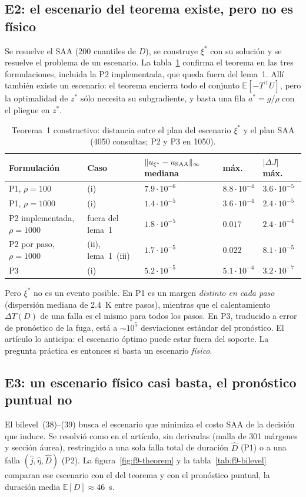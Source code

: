 \subsection{E2: el escenario del teorema existe, pero no es físico}
Se resuelve el SAA (200 cuantiles de $D$), se construye $\xi^*$ con su solución y se resuelve el
problema de un escenario. La tabla~\ref{tab:f9-teorema} confirma el teorema en las tres
formulaciones, incluida la P2 implementada, que queda fuera del lema~1. Allí también existe un
escenario: el teorema encierra todo el conjunto $\mathbb E[-T^\top U]$, pero la optimalidad de
$z^*$ sólo necesita su subgradiente, y basta una fila $a^*=g/\rho$ con el pliegue en $z^*$.

\begin{table}[H]\centering\small
\caption{Teorema~1 constructivo: distancia entre el plan del escenario $\xi^*$ y el plan SAA
(4050 consultas; P2 y P3 en 1050).}
\label{tab:f9-teorema}
\begin{tabular}{@{}lllll@{}}
\toprule
Formulación & Caso & $\|u_{\xi^*}-u_{\rm SAA}\|_\infty$ mediana & máx. & $|\Delta J|$ máx.\\
\midrule
P1, $\rho=100$ & (i) & $7.9\cdot10^{-6}$ & $8.8\cdot10^{-4}$ & $3.6\cdot10^{-5}$\\
P1, $\rho=1000$ & (i) & $1.4\cdot10^{-5}$ & $3.6\cdot10^{-4}$ & $2.4\cdot10^{-5}$\\
P2 implementada, $\rho=1000$ & fuera del lema~1 & $1.8\cdot10^{-5}$ & $0.017$ & $2.4\cdot10^{-4}$\\
P2 por paso, $\rho=1000$ & (ii), lema~1~(iii) & $1.7\cdot10^{-5}$ & $0.022$ & $8.1\cdot10^{-5}$\\
P3 & (i) & $5.2\cdot10^{-5}$ & $5.1\cdot10^{-4}$ & $3.2\cdot10^{-7}$\\
\bottomrule
\end{tabular}
\end{table}

\noindent Pero $\xi^*$ no es un evento posible. En P1 es un margen \emph{distinto en cada paso}
(dispersión mediana de 2.4~K entre pasos), mientras que el calentamiento $\Delta T(D)$ de una
falla es el mismo para todos los pasos. En P3, traducido a error de pronóstico de la fuga, está a
$\sim10^5$ desviaciones estándar del pronóstico. El artículo lo anticipa: el escenario óptimo
puede estar fuera del soporte. La pregunta práctica es entonces si basta un escenario
\emph{físico}.

\subsection{E3: un escenario físico casi basta, el pronóstico puntual no}
El bilevel~(38)--(39) busca el escenario que minimiza el costo SAA de la decisión que induce. Se
resolvió como en el artículo, sin derivadas (malla de 301 márgenes y sección áurea), restringido
a una sola falla total de duración $\hat D$ (P1) o a una falla $(\hat j,\hat\eta,\hat D)$ (P2).
La figura~\ref{fig:f9-theorem} y la tabla~\ref{tab:f9-bilevel} comparan ese escenario con el del
teorema y con el pronóstico puntual, la duración media $\mathbb E[D]\approx46$~s.


